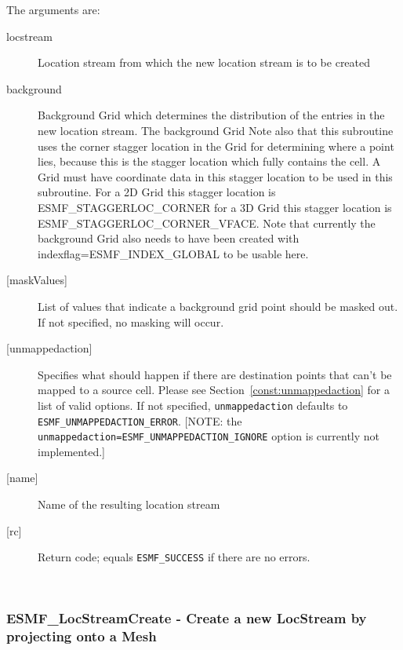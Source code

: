       The arguments are:
       \begin{description}
        \item[locstream]
            Location stream from which the new location stream is to be created
        \item[background]
            Background Grid which determines the distribution of the entries in the new location stream.
            The background Grid 
            Note also that this subroutine uses the corner stagger location in the Grid for determining 
            where a point lies, because this is the stagger location which fully contains the cell. 
            A Grid must have coordinate data in this stagger location to be used in this subroutine. 
            For a 2D Grid this stagger location is ESMF\_STAGGERLOC\_CORNER for a 3D Grid this 
            stagger location is ESMF\_STAGGERLOC\_CORNER\_VFACE. Note that currently the background 
            Grid also needs to have been created with indexflag=ESMF\_INDEX\_GLOBAL to be usable here. 
       \item [{[maskValues]}]
             List of values that indicate a background grid point should be masked out. 
             If not specified, no masking will occur. 
       \item [{[unmappedaction]}]
             Specifies what should happen if there are destination points that
             can't be mapped to a source cell. Please see Section~\ref{const:unmappedaction} for a 
             list of valid options. If not specified, {\tt unmappedaction} defaults to {\tt ESMF\_UNMAPPEDACTION\_ERROR}. [NOTE: the {\tt unmappedaction=ESMF\_UNMAPPEDACTION\_IGNORE} option is currently not implemented.]
        \item[{[name]}]
            Name of the resulting location stream
        \item[{[rc]}]
            Return code; equals {\tt ESMF\_SUCCESS} if there are no errors.
       \end{description}
   
 
\mbox{}\hrulefill\ 
 
\subsubsection [ESMF\_LocStreamCreate] {ESMF\_LocStreamCreate - Create a new LocStream by projecting onto a Mesh}


